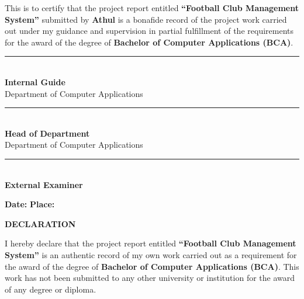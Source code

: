 \documentclass[12pt,a4paper,oneside]{report}
\begin{document}
This is to certify that the project report entitled \textbf{``Football Club Management System''} submitted by \textbf{Athul} is a bonafide record of the project work carried out under my guidance and supervision in partial fulfillment of the requirements for the award of the degree of \textbf{Bachelor of Computer Applications (BCA)}.

\vspace{2cm}

\noindent
\begin{minipage}[t]{0.45\textwidth}
  \centering
  \rule{5cm}{0.4pt}\\[4pt]
  \textbf{Internal Guide}\\
  Department of Computer Applications
\end{minipage}
\hfill
\begin{minipage}[t]{0.45\textwidth}
  \centering
  \rule{5cm}{0.4pt}\\[4pt]
  \textbf{Head of Department}\\
  Department of Computer Applications
\end{minipage}

\vspace{2.5cm}
\noindent
\begin{minipage}[t]{0.45\textwidth}
  \centering
  \rule{5cm}{0.4pt}\\[4pt]
  \textbf{External Examiner}
\end{minipage}

\vspace{1.5cm}
\noindent\textbf{Date:} \hspace{2cm} \textbf{Place:}

\newpage
\thispagestyle{empty}
\begin{center}
  {\Large\bfseries DECLARATION}\\[24pt]
\end{center}

I hereby declare that the project report entitled \textbf{``Football Club Management System''} is an authentic record of my own work carried out as a requirement for the award of the degree of \textbf{Bachelor of Computer Applications (BCA)}. This work has not been submitted to any other university or institution for the award of any degree or diploma.

\vspace{2cm}
\end{document}
